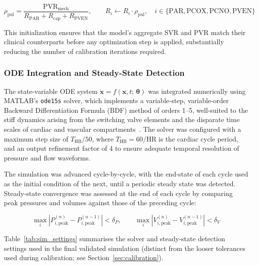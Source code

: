 \documentclass{article}
\begin{document}
\begin{equation}
    \rho_\mathrm{pul}
    = \frac{\mathrm{PVR}_\mathrm{mech}}
           {R_\mathrm{PAR} + R_\mathrm{cap} + R_\mathrm{PVEN}},
    \qquad
    R_i \leftarrow R_i \cdot \rho_\mathrm{pul},
    \quad i \in \{\mathrm{PAR, PCOX, PCNO, PVEN}\}
    \label{eq:pvr_dist}
\end{equation}

\noindent This initialization ensures that the model's aggregate
SVR and PVR match their clinical counterparts before any
optimization step is applied, substantially reducing the number
of calibration iterations required.

\subsubsection{ODE Integration and Steady-State Detection}
\label{sec:ode_integration}

The state-variable ODE system
$\dot{\mathbf{x}} = f(\mathbf{x}, t;\, \boldsymbol{\theta})$
was integrated numerically using MATLAB's \texttt{ode15s} solver,
which implements a variable-step, variable-order
Backward Differentiation Formula (BDF) method of orders 1–5,
well-suited to the stiff dynamics arising from the switching
valve elements and the disparate time scales of cardiac and
vascular compartments~\cite{Ferrero2026Shunts}. The solver was
configured with a maximum step size of $T_\mathrm{HB}/50$, where
$T_\mathrm{HB} = 60/\mathrm{HR}$ is the cardiac cycle period,
and an output refinement factor of 4 to ensure adequate temporal
resolution of pressure and flow waveforms.

The simulation was advanced cycle-by-cycle, with the end-state of
each cycle used as the initial condition of the next, until a
periodic steady state was detected. Steady-state convergence was
assessed at the end of each cycle by comparing peak pressures and
volumes against those of the preceding cycle:

\begin{equation}
    \max_i \left| P_{i,\mathrm{peak}}^{(n)}
                - P_{i,\mathrm{peak}}^{(n-1)} \right|
    < \delta_P,
    \qquad
    \max_i \left| V_{i,\mathrm{peak}}^{(n)}
                - V_{i,\mathrm{peak}}^{(n-1)} \right|
    < \delta_V
    \label{eq:ss_criterion}
\end{equation}

Table~\ref{tab:sim_settings} summarises the solver and
steady-state detection settings used in the final validated
simulation (distinct from the looser tolerances used during
calibration; see Section~\ref{sec:calibration}).
\end{document}
